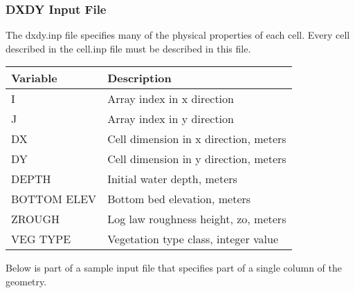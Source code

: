 \documentclass[letterpaper,10pt,english]{sphinxmanual}
\begin{document}
\begin{sphinxVerbatim}[commandchars=\\\{\}]
       
             
     
       
       
       
       
       
     
\end{sphinxVerbatim}


\subsubsection{DXDY Input File}
\label{\detokenize{inputfiles/hydrodynamics_files/dxdy_rst:dxdy-input-file}}\label{\detokenize{inputfiles/hydrodynamics_files/dxdy_rst:dxdy-rst}}\label{\detokenize{inputfiles/hydrodynamics_files/dxdy_rst::doc}}
The dxdy.inp file specifies many of the physical properties of each cell.  Every cell described in the cell.inp file must be described in this file.


\begin{savenotes}\sphinxattablestart
\centering
\begin{tabulary}{\linewidth}[t]{|T|T|}
\hline
\sphinxstyletheadfamily 
Variable
&\sphinxstyletheadfamily 
Description
\\
\hline
I
&
Array index in x direction
\\
\hline
J
&
Array index in y direction
\\
\hline
DX
&
Cell dimension in x direction, meters
\\
\hline
DY
&
Cell dimension in y direction, meters
\\
\hline
DEPTH
&
Initial water depth, meters
\\
\hline
BOTTOM ELEV
&
Bottom bed elevation, meters
\\
\hline
ZROUGH
&
Log law roughness height, zo, meters
\\
\hline
VEG TYPE
&
Vegetation type class, integer value
\\
\hline
\end{tabulary}
\par
\sphinxattableend\end{savenotes}

Below is part of a sample input file that specifies part of a single column of the geometry.
\end{document}
